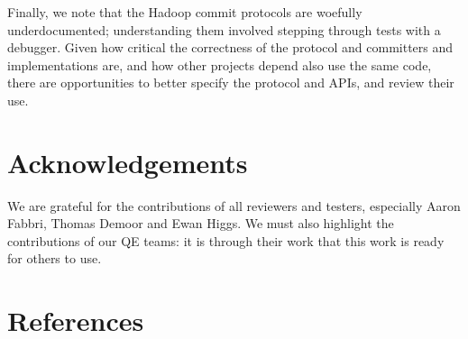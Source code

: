 \documentclass[conference]{IEEEtran}
\begin{document}
Finally, we note that the Hadoop commit protocols are woefully underdocumented;
understanding them involved stepping through tests with a debugger.
Given how critical the correctness of the protocol and committers and implementations
are, and how other projects depend also use the same code, there
are opportunities to better specify the protocol and APIs, and review
their use.


\section*{Acknowledgements}
\label{sec:acknowledgements}

We are grateful for the contributions of all reviewers and testers, especially
Aaron Fabbri, Thomas Demoor and Ewan Higgs.
We must also highlight the contributions of our QE teams: it is through
their work that this work is ready for others to use.


\section{References}
\label{sec:references}




\end{document}
